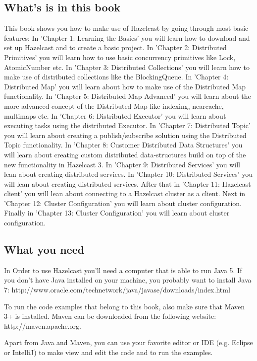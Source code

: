 \subsection*{What's is in this book}
This book shows you how to make use of Hazelcast by going through most basic features:
In 'Chapter 1: Learning the Basics' you will learn how to download and set up Hazelcast and to create a basic project.
In 'Chapter 2: Distributed Primitives' you will learn how to use basic concurrency primitives like Lock, AtomicNumber etc.
In 'Chapter 3: Distributed Collections' you will learn how to make use of distributed collections like the BlockingQueue.
In 'Chapter 4: Distributed Map' you will learn about how to make use of the Distributed Map functionality.
In 'Chapter 5: Distributed Map Advanced' you will learn about the more advanced concept of the Distributed Map like indexing, nearcache, multimaps etc.
In 'Chapter 6: Distributed Executor' you will learn about executing tasks using the distributed Executor.
In 'Chapter 7: Distributed Topic' you will learn about creating a publish/subscribe solution using the Distributed Topic functionality.
In 'Chapter 8: Customer Distributed Data Structures' you will learn about creating custom distributed data-structures build on top of the new functionality in Hazelcast 3.
In 'Chapter 9: Distributed Services' you will lean about creating distributed services.
In 'Chapter 10: Distributed Services' you will lean about creating distributed services.
After that in  'Chapter 11: Hazelcast client' you will lean about connecting to a Hazelcast cluster as a client.
Next in 'Chapter 12: Cluster Configuration' you will learn about cluster configuration.
Finally in 'Chapter 13: Cluster Configuration' you will learn about cluster configuration.

\subsection*{What you need}
In Order to use Hazelcast you'll need a computer that is able to run Java 5. If you don't have Java installed on your machine, you probably want to install Java 7: 
http://www.oracle.com/technetwork/java/javase/downloads/index.html

To run the code examples that belong to this book, also make sure that Maven 3+ is installed. Maven can be downloaded from the following website: 
http://maven.apache.org.

Apart from Java and Maven, you can use your favorite editor or IDE (e.g. Eclipse or IntelliJ) to make view and edit the code and to run the examples. 
